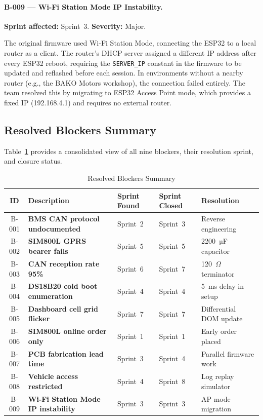 \paragraph{B-009 --- Wi-Fi Station Mode IP Instability.}
\textbf{Sprint affected:} Sprint~3. \textbf{Severity:} Major.

The original firmware used Wi-Fi Station Mode, connecting the ESP32 to a local router as a client. The router's DHCP server assigned a different IP address after every ESP32 reboot, requiring the \texttt{SERVER\_IP} constant in the firmware to be updated and reflashed before each session. In environments without a nearby router (e.g., the BAKO Motors workshop), the connection failed entirely. The team resolved this by migrating to ESP32 Access Point mode, which provides a fixed IP (192.168.4.1) and requires no external router.

\subsection{Resolved Blockers Summary}

Table~\ref{tab:blockers-summary} provides a consolidated view of all nine blockers, their resolution sprint, and closure status.

\begin{table}[H]
\centering
\caption{Resolved Blockers Summary}
\label{tab:blockers-summary}
\small
\begin{tabular}{c >{\bfseries}p{4.5cm} p{2.0cm} p{2.0cm} p{2.5cm}}
\toprule
ID & Description & Sprint Found & Sprint Closed & Resolution \\
\midrule
B-001 & BMS CAN protocol undocumented     & Sprint~2 & Sprint~3 & Reverse engineering \\
B-002 & SIM800L GPRS bearer fails           & Sprint~5 & Sprint~5 & 2200~µF capacitor \\
B-003 & CAN reception rate 95\%            & Sprint~6 & Sprint~7 & 120~$\Omega$ terminator \\
B-004 & DS18B20 cold boot enumeration      & Sprint~4 & Sprint~4 & 5~ms delay in setup \\
B-005 & Dashboard cell grid flicker        & Sprint~7 & Sprint~7 & Differential DOM update \\
B-006 & SIM800L online order only         & Sprint~1 & Sprint~1 & Early order placed \\
B-007 & PCB fabrication lead time          & Sprint~3 & Sprint~4 & Parallel firmware work \\
B-008 & Vehicle access restricted          & Sprint~4 & Sprint~8 & Log replay simulator \\
B-009 & Wi-Fi Station Mode IP instability  & Sprint~3 & Sprint~3 & AP mode migration \\
\bottomrule
\end{tabular}
\end{table}
